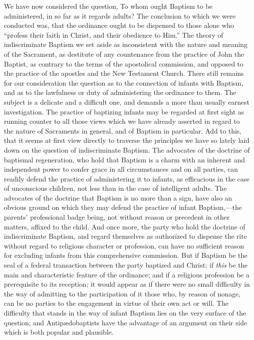 \documentclass[
  english,
]{book}
\begin{document}
We have now considered the question, To whom ought Baptism to be administered, in so far as it regards adults? The conclusion to which we were conducted was, that the ordinance ought to be dispensed to those alone who ``profess their faith in Christ, and their obedience to Him.'' The theory of indiscriminate Baptism we set aside as inconsistent with the nature and meaning of the Sacrament, as destitute of any countenance from the practice of John the Baptist, as contrary to the terms of the apostolical commission, and opposed to the practice of the apostles and the New Testament Church. There still remains for our consideration the question as to the connection of infants with Baptism, and as to the lawfulness or duty of administering the ordinance to them. The subject is a delicate and a difficult one, and demands a more than usually earnest investigation. The practice of baptizing infants may be regarded at first sight as running counter to all those views which we have already asserted in regard to the nature of Sacraments in general, and of Baptism in particular. Add to this, that it seems at first view directly to traverse the principles we have so lately laid down on the question of indiscriminate Baptism. The advocates of the doctrine of baptismal regeneration, who hold that Baptism is a charm with an inherent and independent power to confer grace in all circumstances and on all parties, can readily defend the practice of administering it to infants, as efficacious in the case of unconscious children, not less than in the case of intelligent adults. The advocates of the doctrine that Baptism is no more than a sign, have also an obvious ground on which they may defend the practice of infant Baptism,---the parents' professional badge being, not without reason or precedent in other matters, affixed to the child. And once more, the party who hold the doctrine of indiscriminate Baptism, and regard themselves as authorized to dispense the rite without regard to religious character or profession, can have no sufficient reason for excluding infants from this comprehensive commission. But if Baptism be the seal of a federal transaction between the party baptized and Christ; if \emph{this} be the main and characteristic feature of the ordinance; and if a religious profession be a prerequisite to its reception; it would appear as if there were no small difficulty in the way of admitting to the participation of it those who, by reason of nonage, can be no parties to the engagement in virtue of their own act or will. The difficulty that stands in the way of infant Baptism lies on the very surface of the question; and Antipædobaptists have the advantage of an argument on their side which is both popular and plausible.
\end{document}
